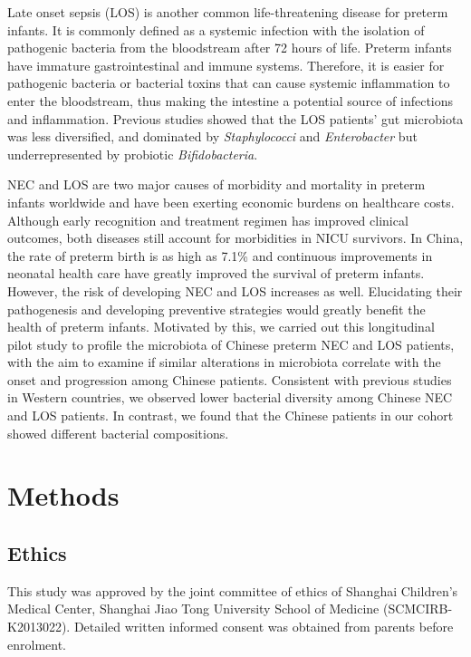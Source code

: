 \documentclass[fleqn,10pt, lineno]{wlpeerj} %
\begin{document}
Late onset sepsis (LOS) is another common life-threatening disease for preterm infants.  It is commonly defined as a systemic infection with the isolation of pathogenic bacteria from the bloodstream after 72 hours of life\citep{rao2016one, pickering2012red}. Preterm infants have immature gastrointestinal and immune systems.  Therefore, it is easier for  pathogenic bacteria or bacterial toxins that can cause systemic inflammation to enter the bloodstream\citep{schwiertz2003development, bezirtzoglou2011microbiota, Cernada2016Sepsis, Sharon2015Gut, korpela2018intestinal}, thus making the intestine a potential source of infections and inflammation.  Previous studies showed that the LOS patients' gut microbiota was less diversified, and dominated by \textit{Staphylococci} and \textit{Enterobacter} but underrepresented by probiotic \textit{Bifidobacteria}\citep{madan2012gut,tarr2016gut,Stewart2017Longitudinal,korpela2018intestinal,ficara2018changes}.

NEC and LOS are two major causes of morbidity and mortality in preterm infants worldwide and have been exerting economic burdens on healthcare costs\citep{johnson2013cost,johnson2014economic, mowitz2018cost}. Although early recognition and treatment regimen has improved clinical outcomes, both diseases still account for morbidities in NICU survivors\citep{hintz2005neurodevelopmental, zonnenberg2019neurodevelopmental, shah2015risk}.
In China, the rate of preterm birth is as high as 7.1\%\citep{blencowe2012national} and continuous improvements in neonatal health care have greatly improved the survival of preterm infants. However, the risk of developing NEC and LOS increases as well. Elucidating their pathogenesis and developing preventive strategies would greatly benefit the health of preterm infants. Motivated by this, we carried out this longitudinal pilot study to profile the microbiota of Chinese preterm NEC and LOS patients, with the aim to examine if similar alterations in microbiota correlate with the onset and progression among Chinese patients.   Consistent with previous studies in Western countries, we observed lower bacterial diversity among Chinese NEC and LOS patients.  In contrast, we found that the Chinese patients in our cohort showed different bacterial compositions.

\section*{Methods}
  \subsection*{Ethics}
  This study was approved by the joint committee of ethics of Shanghai Children’s Medical Center, Shanghai Jiao Tong University School of Medicine (SCMCIRB-K2013022). Detailed written informed consent was obtained from parents before enrolment.
\end{document}
